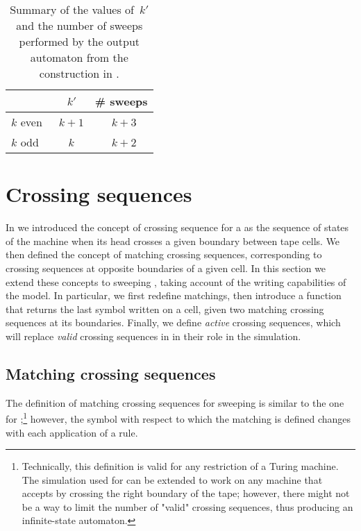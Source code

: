 \begin{table}
	\centering
	\begin{tabular}{lcc}
		\toprule
		~        &~$k'$  & \# sweeps \\
		\midrule
		$k$ even &~$k+1$ &~$k+3$     \\
		$k$ odd  &~$k$   &~$k+2$     \\
		\bottomrule
	\end{tabular}
	\caption[The values of~$k'$ and the number of sweeps performed by a sweeping \kDLA in normal form.]{Summary of the values of~$k'$ and the number of sweeps performed by the output automaton from the construction in .}
	\label{tab:kprimesweep}
\end{table}



\section{Crossing sequences}\label{sec:crossseqswdla}
In  we introduced the concept of crossing sequence for a \TDFA as the sequence of states of the machine when its head crosses a given boundary between tape cells.
We then defined the concept of matching crossing sequences, corresponding to crossing sequences at opposite boundaries of a given cell.
In this section we extend these concepts to sweeping \kDLAs, taking account of the writing capabilities of the model.
In particular, we first redefine matchings, then introduce a function that returns the last symbol written on a cell, given two matching crossing sequences at its boundaries.
Finally, we define \emph{active} crossing sequences, which will replace \emph{valid} crossing sequences in \TDFAs in their role in the simulation.


\subsection{Matching crossing sequences}\label{sub:crossseqswdla-matching}
The definition of matching crossing sequences for sweeping \kDLAs is similar to the one for \TDFAs;\footnote{%
	Technically, this definition is valid for any restriction of a Turing machine. The simulation used for \TDFAs can be extended to work on any machine that accepts by crossing the right boundary of the tape; however, there might not be a way to limit the number of "valid" crossing sequences, thus producing an infinite-state automaton.}
however, the symbol with respect to which the matching is defined changes with each application of a rule.

